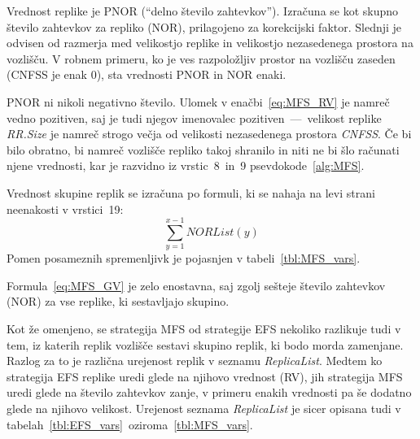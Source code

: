 \documentclass[a4paper, 12pt]{book}
\begin{document}
Vrednost replike je PNOR (``delno število zahtevkov''). Izračuna
se kot skupno število zahtevkov za repliko (NOR), prilagojeno za
korekcijski faktor. Slednji je odvisen od razmerja med velikostjo replike
in velikostjo nezasedenega prostora na vozlišču. V robnem primeru,
ko je ves razpoložljiv prostor na vozlišču zaseden (CNFSS je enak 0), sta
vrednosti PNOR in NOR enaki.

PNOR ni nikoli negativno število. Ulomek v enačbi~\eqref{eq:MFS_RV} je namreč
vedno pozitiven, saj je tudi njegov imenovalec pozitiven~---~velikost replike
\textit{RR.Size} je namreč strogo večja od velikosti nezasedenega prostora
\textit{CNFSS}. Če bi bilo obratno, bi namreč vozlišče repliko takoj shranilo
in niti ne bi šlo računati njene vrednosti, kar je razvidno iz vrstic~8~in~9
psevdokode~\ref{alg:MFS}.

\begin{samepage}
Vrednost skupine replik se izračuna po formuli, ki se nahaja na levi strani
neenakosti v vrstici~19:
\begin{equation}
	\sum\limits_{y=1}^{x-1} \mathit{NORList(y)}
  \label{eq:MFS_GV}
\end{equation}
Pomen posameznih spremenljivk je pojasnjen v tabeli~\ref{tbl:MFS_vars}.
\end{samepage}
\vspace{1em}

Formula~\eqref{eq:MFS_GV} je zelo enostavna, saj zgolj sešteje število
zahtevkov (NOR) za vse replike, ki sestavljajo skupino.

Kot že omenjeno, se strategija MFS od strategije EFS nekoliko razlikuje
tudi v tem, iz katerih replik vozlišče sestavi skupino replik, ki bodo morda
zamenjane. Razlog za to je različna urejenost replik v seznamu
\textit{ReplicaList}. Medtem ko strategija EFS replike uredi glede na
njihovo vrednost (RV), jih strategija MFS uredi glede na
število zahtevkov zanje, v primeru enakih vrednosti pa še dodatno
glede na njihovo velikost. Urejenost seznama \textit{ReplicaList} je
sicer opisana tudi v tabelah~\ref{tbl:EFS_vars}~oziroma~\ref{tbl:MFS_vars}.
\end{document}
